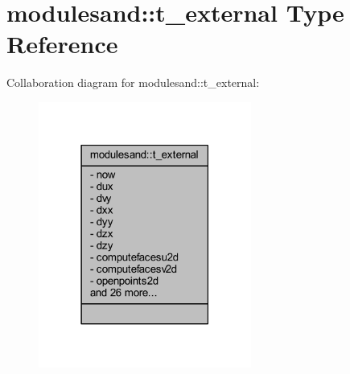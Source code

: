 \hypertarget{structmodulesand_1_1t__external}{}\section{modulesand\+:\+:t\+\_\+external Type Reference}
\label{structmodulesand_1_1t__external}


Collaboration diagram for modulesand\+:\+:t\+\_\+external\+:\nopagebreak
\begin{figure}[H]
\begin{center}
\leavevmode
\includegraphics[width=198pt]{structmodulesand_1_1t__external__coll__graph}
\end{center}
\end{figure}
